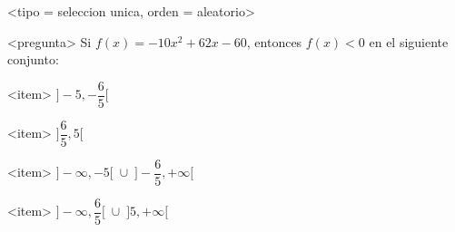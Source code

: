 <tipo = seleccion unica, orden = aleatorio>

<pregunta>
Si $f(x) = -10x^2 +62x -60$, entonces $f(x) < 0$ en el siguiente conjunto:


<item>
$\bigg]-5, -\dfrac{6}{5}\bigg[$

<item>
$\bigg]\dfrac{6}{5}, 5\bigg[$

<item>
$\bigg]{-}\infty, -5\bigg[\;\cup\; \bigg]-\dfrac{6}{5},+\infty\bigg[$

<item>
$\bigg]{-}\infty, \dfrac{6}{5}\bigg[\;\cup\; \bigg]5,+\infty\bigg[$

 


